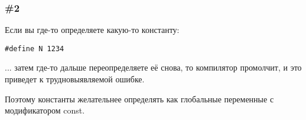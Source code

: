 \subsubsection{\#2}

Если вы где-то определяете какую-то константу:

\begin{lstlisting}
#define N 1234
\end{lstlisting}

... затем где-то дальше переопределяете её снова, то компилятор промолчит, и это приведет к трудновыявляемой
ошибке.

Поэтому константы желательнее определять как глобальные переменные с модификатором const.

